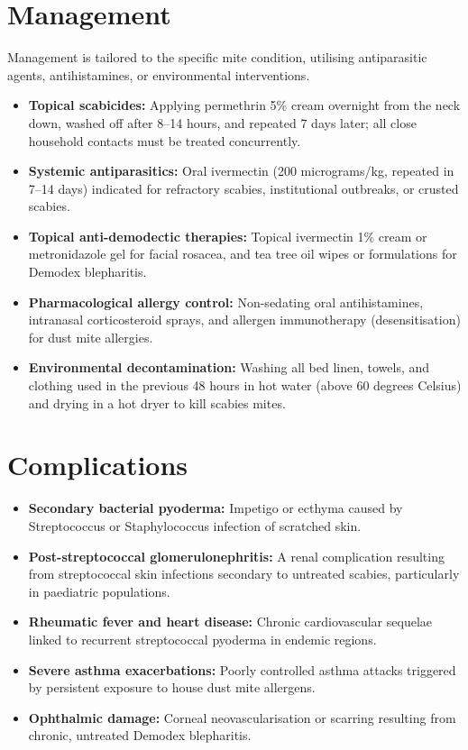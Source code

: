 \section*{Management}
Management is tailored to the specific mite condition, utilising antiparasitic agents, antihistamines, or environmental interventions.
\begin{itemize}
    \item \textbf{Topical scabicides:} Applying permethrin 5\% cream overnight from the neck down, washed off after 8--14 hours, and repeated 7 days later; all close household contacts must be treated concurrently.
    \item \textbf{Systemic antiparasitics:} Oral ivermectin (200 micrograms/kg, repeated in 7--14 days) indicated for refractory scabies, institutional outbreaks, or crusted scabies.
    \item \textbf{Topical anti-demodectic therapies:} Topical ivermectin 1\% cream or metronidazole gel for facial rosacea, and tea tree oil wipes or formulations for Demodex blepharitis.
    \item \textbf{Pharmacological allergy control:} Non-sedating oral antihistamines, intranasal corticosteroid sprays, and allergen immunotherapy (desensitisation) for dust mite allergies.
    \item \textbf{Environmental decontamination:} Washing all bed linen, towels, and clothing used in the previous 48 hours in hot water (above 60 degrees Celsius) and drying in a hot dryer to kill scabies mites.
\end{itemize}

\section*{Complications}
\begin{itemize}
    \item \textbf{Secondary bacterial pyoderma:} Impetigo or ecthyma caused by Streptococcus or Staphylococcus infection of scratched skin.
    \item \textbf{Post-streptococcal glomerulonephritis:} A renal complication resulting from streptococcal skin infections secondary to untreated scabies, particularly in paediatric populations.
    \item \textbf{Rheumatic fever and heart disease:} Chronic cardiovascular sequelae linked to recurrent streptococcal pyoderma in endemic regions.
    \item \textbf{Severe asthma exacerbations:} Poorly controlled asthma attacks triggered by persistent exposure to house dust mite allergens.
    \item \textbf{Ophthalmic damage:} Corneal neovascularisation or scarring resulting from chronic, untreated Demodex blepharitis.
\end{itemize}

